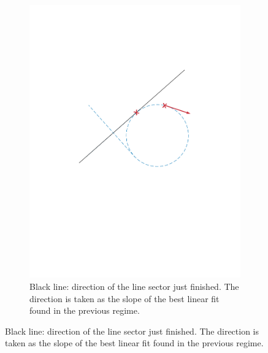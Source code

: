 \begin{itemize}
\begin{figure}[!htbp]
\begin{subfigure}[b]{0.45\textwidth}
        \includegraphics[width=\textwidth]{img/intersection_2.pdf}
        \caption{Black line: direction of the line sector just finished. The direction is taken as the slope of the best linear fit found in the previous regime.}
        \label{fig:two}
   \end{subfigure}
   

\end{figure}
\end{itemize}
